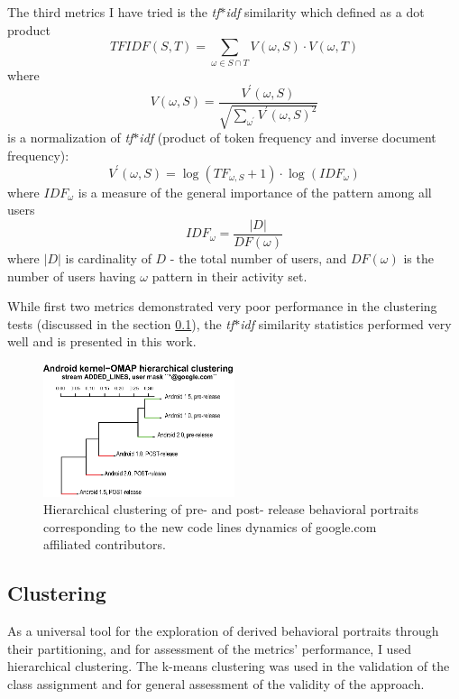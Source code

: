 \documentclass[conference]{worldcomp}
\begin{document}
The third metrics I have tried is the \textit{tf$\ast$idf} similarity which defined as a dot product 
\begin{equation}
 TFIDF(S,T) = \sum_{\omega \in S \cap T} V(\omega, S) \cdot V(\omega, T)
\end{equation} 
where 
\begin{equation}
 V(\omega, S) = \frac { V^{\prime} (\omega,S) } { \sqrt{ \sum_{\omega^{\prime}} V^{\prime} (\omega,S)^{2}} }
\end{equation} 
is a normalization of \textit{tf$\ast$idf} (product of token frequency and inverse document frequency):
\begin{equation}
 V^{\prime} (\omega,S) = \log(TF_{\omega, S} +1) \cdot \log(IDF_{\omega})
\end{equation} 
where $IDF_{\omega}$ is a measure of the general importance of the pattern among all users
\begin{equation}
 IDF_{\omega} = \frac{|D|}{DF(\omega)}
\end{equation} 
where $|D|$ is cardinality of $D$ - the total number of users, and $DF(\omega)$ is the number of users 
having $\omega$ pattern in their activity set. 

While first two metrics demonstrated very poor performance in the clustering tests (discussed in the section \ref{clustering}), 
the \textit{tf$\ast$idf} similarity statistics performed very well and is presented in this work.

\begin{figure}[t]
  \centering
  \includegraphics[width=0.5\textwidth]{figures/omap-hclust.eps}
  \caption{Hierarchical clustering of pre- and post- release behavioral portraits corresponding to the new code lines dynamics of google.com affiliated contributors.}
  \label{fig:kernel_cluster}
\end{figure}

\subsection{Clustering} \label{clustering}
As a universal tool for the exploration of derived behavioral portraits through their partitioning, 
and for assessment of the metrics' performance, I used hierarchical clustering. The k-means
clustering was used in the validation of the class assignment and for general assessment of 
the validity of the approach.
\end{document}
